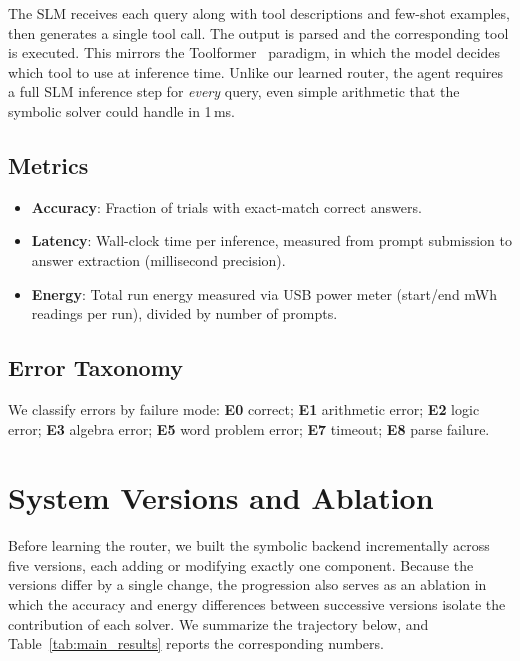 \documentclass[journal]{IEEEtai}
\begin{document}
The SLM receives each query along with tool descriptions and few-shot examples, then generates a single tool call. The output is parsed and the corresponding tool is executed. This mirrors the Toolformer~\cite{schick2023toolformer} paradigm, in which the model decides which tool to use at inference time. Unlike our learned router, the agent requires a full SLM inference step for \emph{every} query, even simple arithmetic that the symbolic solver could handle in 1\,ms.

\subsection{Metrics}

\begin{itemize}
    \item \textbf{Accuracy}: Fraction of trials with exact-match correct answers.
    \item \textbf{Latency}: Wall-clock time per inference, measured from prompt submission to answer extraction (millisecond precision).
    \item \textbf{Energy}: Total run energy measured via USB power meter (start/end mWh readings per run), divided by number of prompts.
\end{itemize}

\subsection{Error Taxonomy}

We classify errors by failure mode: \textbf{E0} correct; \textbf{E1} arithmetic error; \textbf{E2} logic error; \textbf{E3} algebra error; \textbf{E5} word problem error; \textbf{E7} timeout; \textbf{E8} parse failure.


\section{System Versions and Ablation}
\label{sec:versions}

Before learning the router, we built the symbolic backend incrementally across five versions, each adding or modifying exactly one component. Because the versions differ by a single change, the progression also serves as an ablation in which the accuracy and energy differences between successive versions isolate the contribution of each solver. We summarize the trajectory below, and Table~\ref{tab:main_results} reports the corresponding numbers.
\end{document}
